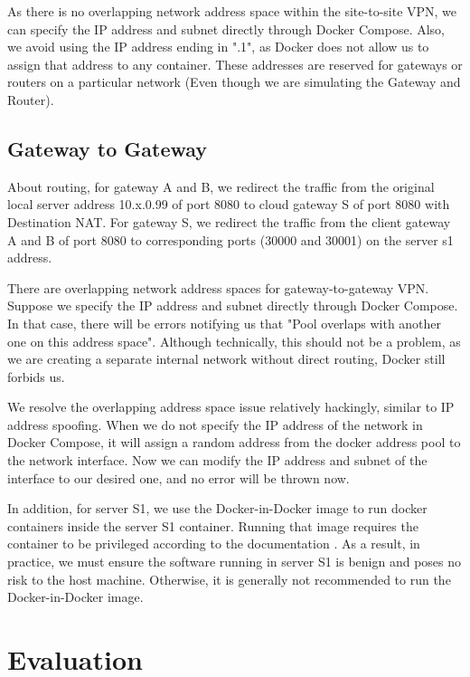 \documentclass[article]{aaltoseries}
\begin{document}
As there is no overlapping network address space within the site-to-site VPN, we can specify the IP address and subnet directly through Docker Compose. Also, we avoid using the IP address ending in ".1", as Docker does not allow us to assign that address to any container. These addresses are reserved for gateways or routers on a particular network (Even though we are simulating the Gateway and Router).

\subsection{Gateway to Gateway}

About routing, for gateway A and B, we redirect the traffic from the original local server address 10.x.0.99 of port 8080 to cloud gateway S of port 8080 with Destination NAT. For gateway S, we redirect the traffic from the client gateway A and B of port 8080 to corresponding ports (30000 and 30001) on the server s1 address.

There are overlapping network address spaces for gateway-to-gateway VPN. Suppose we specify the IP address and subnet directly through Docker Compose. In that case, there will be errors notifying us that "Pool overlaps with another one on this address space". Although technically, this should not be a problem, as we are creating a separate internal network without direct routing, Docker still forbids us.

We resolve the overlapping address space issue relatively hackingly, similar to IP address spoofing. When we do not specify the IP address of the network in Docker Compose, it will assign a random address from the docker address pool to the network interface. Now we can modify the IP address and subnet of the interface to our desired one, and no error will be thrown now.

In addition, for server S1, we use the Docker-in-Docker image to run docker containers inside the server S1 container. Running that image requires the container to be privileged according to the documentation \cite{docker}. As a result, in practice, we must ensure the software running in server S1 is benign and poses no risk to the host machine. Otherwise, it is generally not recommended to run the Docker-in-Docker image.



\section{Evaluation}
\end{document}
